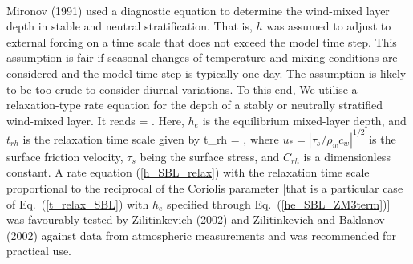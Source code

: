  \ \\
\noindent
\nopagebreak
%
\noindent
Mironov \etal (1991)\nocite{mironovbook1991} used a diagnostic equation to determine
the wind-mixed layer depth in stable and neutral stratification.
That is, $h$ was assumed to adjust to external forcing 
on a time scale that does not exceed the model time step.
This assumption is fair if seasonal changes of temperature 
and mixing conditions are considered and the model time step is typically one day.  
The assumption is likely to be too crude to consider diurnal variations. 
To this end, We utilise a relaxation-type rate equation for the depth 
of a stably or neutrally stratified wind-mixed layer.
It reads 
%
\beq\label{h_SBL_relax}
 =  . 
\eeq
%
Here, $h_e$ is the equilibrium mixed-layer depth,
and $t_{rh}$ is the relaxation time scale given by 
%
\beq\label{t_relax_SBL}
t_{rh} =  ,
\eeq
%
where $u_{*}=|\tau_s/\rho_w c_w|^{1/2}$ is the surface friction velocity, 
$\tau_s$ being the surface stress,
and $C_{rh}$ is a dimensionless constant.
A rate equation (\ref{h_SBL_relax})
with the relaxation time scale proportional to the 
reciprocal of the Coriolis parameter
[that is a particular case of Eq.~(\ref{t_relax_SBL}) 
with $h_e$ specified through Eq.~(\ref{he_SBL_ZM3term})]
was favourably tested by Zilitinkevich \etal (2002)\nocite{zilitin2002} and 
Zilitinkevich and Baklanov (2002)\nocite{zilitinbak2002} 
against data from atmospheric measurements
and was recommended for practical use.

